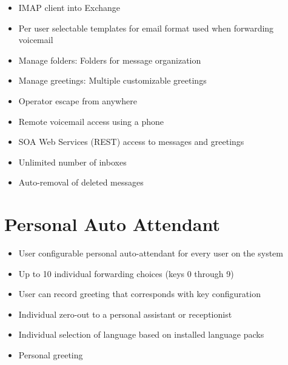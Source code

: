 \documentclass[letterpaper,10pt,english]{sphinxmanual}
\begin{document}
\begin{itemize}
\item {} 
IMAP client into Exchange

\item {} 
Per user selectable templates for email format used when forwarding voicemail

\item {} 
Manage folders: Folders for message organization

\item {} 
Manage greetings: Multiple customizable greetings

\item {} 
Operator escape from anywhere

\item {} 
Remote voicemail access using a phone

\item {} 
SOA Web Services (REST) access to messages and greetings

\item {} 
Unlimited number of inboxes

\item {} 
Auto-removal of deleted messages

\end{itemize}


\section{Personal Auto Attendant}
\label{\detokenize{features:personal-auto-attendant}}\begin{itemize}
\item {} 
User configurable personal auto-attendant for every user on the system

\item {} 
Up to 10 individual forwarding choices (keys 0 through 9)

\item {} 
User can record greeting that corresponds with key configuration

\item {} 
Individual zero-out to a personal assistant or receptionist

\item {} 
Individual selection of language based on installed language packs

\item {} 
Personal greeting

\end{itemize}
\end{document}
